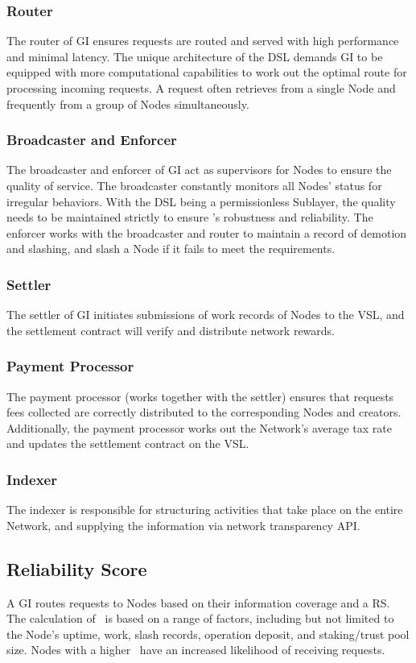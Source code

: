 \subsubsection{Router}
The router of \gls{GI} ensures requests are routed and served with high performance and minimal latency.
The unique architecture of the \gls{DSL} demands \gls{GI} to be equipped with more computational capabilities to work out the optimal route for processing incoming requests. A request often retrieves  from a single \gls{Node} and frequently from a group of \glspl{Node} simultaneously.

\subsubsection{Broadcaster and Enforcer}
The broadcaster and enforcer of \gls{GI} act as supervisors for \glspl{Node} to ensure the quality of service. The broadcaster constantly monitors all \glspl{Node}' status for irregular behaviors. With the \gls{DSL} being a permissionless Sublayer, the quality needs to be maintained strictly to ensure 's robustness and reliability.
The enforcer works with the broadcaster and router to maintain a record of demotion and slashing, and slash a \gls{Node} if it fails to meet the requirements.

\subsubsection{Settler}
The settler of \gls{GI} initiates submissions of work records of \glspl{Node} to the \gls{VSL}, and the settlement contract will verify and distribute network rewards.

\subsubsection{Payment Processor}
The payment processor (works together with the settler) ensures that requests fees collected are correctly distributed to the corresponding Nodes and creators.
Additionally, the payment processor works out the Network's average tax rate and updates the settlement contract on the \gls{VSL}.

\subsubsection{Indexer}
The indexer is responsible for structuring activities that take place on the entire Network, and supplying the information via network transparency API.

\subsection{Reliability Score}

A \gls{GI} routes requests to \glspl{Node} based on their information coverage and a \gls{RS}.
The calculation of \reliabilityScore\ is based on a range of factors, including but not limited to the \gls{Node}'s uptime, work, slash records, operation deposit, and staking/trust pool size.
\glspl{Node} with a higher \reliabilityScore\ have an increased likelihood of receiving requests.
